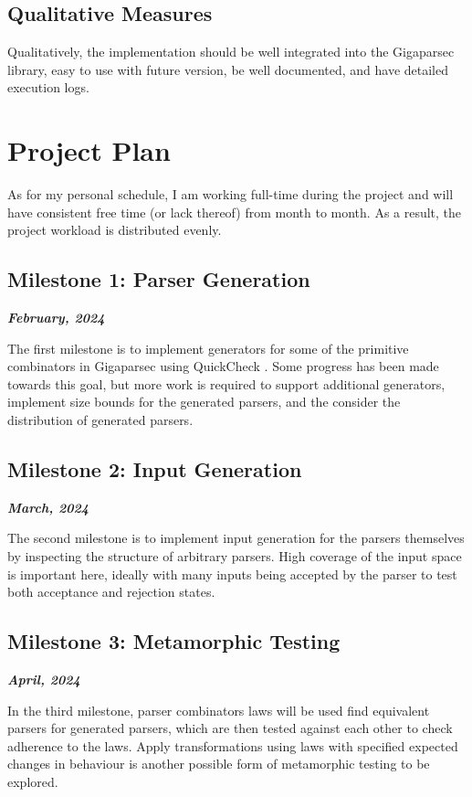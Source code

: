 \documentclass[11pt]{article}
\newcommand{\be}[1]{\textbf{\emph{#1}}}
\begin{document}
\subsection{Qualitative Measures}

Qualitatively, the implementation should be well integrated into the Gigaparsec library, easy to use with future version, be well documented, and have detailed execution logs.

\section{Project Plan} %

As for my personal schedule, I am working full-time during the project and will have consistent free time (or lack thereof) from month to month. As a result, the project workload is distributed evenly.

\subsection{Milestone 1: Parser Generation}
\be{February, 2024}

The first milestone is to implement generators for some of the primitive combinators in Gigaparsec using QuickCheck \cite{quickcheck}. Some progress has been made towards this goal, but more work is required to support additional generators, implement size bounds for the generated parsers, and the consider the distribution of generated parsers.

\subsection{Milestone 2: Input Generation}
\be{March, 2024}

The second milestone is to implement input generation for the parsers themselves by inspecting the structure of arbitrary parsers. High coverage of the input space is important here, ideally with many inputs being accepted by the parser to test both acceptance and rejection states.

\subsection{Milestone 3: Metamorphic Testing}
\be{April, 2024}

In the third milestone, parser combinators laws will be used find equivalent parsers for generated parsers, which are then tested against each other to check adherence to the laws. Apply transformations using laws with specified expected changes in behaviour is another possible form of metamorphic testing to be explored.
\end{document}
